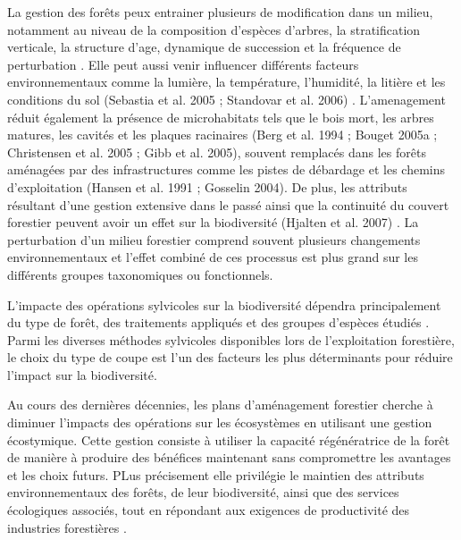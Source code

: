 
La gestion des forêts peux entrainer plusieurs de modification dans un milieu, notamment au niveau de la composition d'espèces d'arbres, la stratification verticale, la structure d'age, dynamique de succession et la fréquence de perturbation \citep{Commarmot2005Structurevirgin}. 
Elle peut aussi venir influencer différents facteurs environnementaux comme la lumière, la température, l'humidité, la litière et les conditions du sol (Sebastia et al. 2005 ; Standovar et al. 2006) \citep{Jerabkova2011metaanalysiseffects,Michal2014Responsessmall,James2016effectharvest,Zhang2022Intensiveforest}. 
L'amenagement réduit également la présence de microhabitats tels que le bois mort, les arbres matures, les cavités et les plaques racinaires \citep{Spies1999Dynamicforest} (Berg et al. 1994 ; Bouget 2005a ; Christensen et al. 2005 ; Gibb et al. 2005), souvent remplacés dans les forêts aménagées par des infrastructures comme les pistes de débardage et les chemins d'exploitation \citep{}(Hansen et al. 1991 ; Gosselin 2004). 
De plus, les attributs résultant d'une gestion extensive dans le passé ainsi que la continuité du couvert forestier peuvent avoir un effet sur la biodiversité (Hjalten et al. 2007) \citep{}. 
La perturbation d'un milieu forestier comprend souvent plusieurs changements environnementaux et l'effet combiné de ces processus est plus grand sur les différents groupes taxonomiques ou fonctionnels. 

L'impacte des opérations sylvicoles sur la biodiversité dépendra principalement du type de forêt, des traitements appliqués et des groupes d'espèces étudiés \citep{Paillet2010Biodiversitydifferences,Kudrin2023metaanalysiseffects}. 
Parmi les diverses méthodes sylvicoles disponibles lors de l'exploitation forestière, le choix du type de coupe est l'un des facteurs les plus déterminants pour réduire l'impact sur la biodiversité. 

Au cours des dernières décennies, les plans d’aménagement forestier cherche à diminuer l'impacts des opérations sur les écosystèmes en utilisant une gestion écostymique. 
Cette gestion consiste à utiliser la capacité régénératrice de la forêt de manière à produire des bénéfices maintenant sans compromettre les avantages et les choix futurs. 
PLus précisement elle privilégie le maintien des attributs environnementaux des forêts, de leur biodiversité, ainsi que des services écologiques associés, tout en répondant aux exigences de productivité des industries forestières \citep{Perry1998scientificbasis,Szaro1998emergenceecosystem,Kuuluvainen2009Forestmanagement,MacDicken2015Globalprogress}. 

